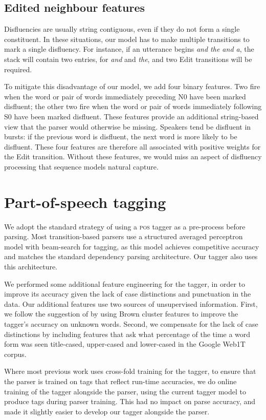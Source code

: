 \documentclass[11pt,letterpaper]{article}
\newcommand{\pos}{\textsc{pos}\xspace}
\begin{document}
\subsection{Edited neighbour features}

Disfluencies are usually
string contiguous, even if they do not form a single constituent.
In these situations, our model has to make multiple transitions to mark a single
disfluency. For instance, if an utterance begins \emph{and the and a}, the stack
will contain two entries, for \emph{and} and \emph{the}, and two Edit transitions
will be required.

To mitigate this disadvantage of our model, we add four binary features. Two fire
when the word or pair of words immediately preceding N0 have been marked disfluent;
the other two fire when the word or pair of words immediately following S0
have been marked disfluent. These features provide an additional string-based
view that the parser would otherwise be missing.  Speakers tend be disfluent
in bursts: if the previous word is disfluent, the next word is more likely
to be disfluent.  These four features are therefore all associated with
positive weights for the Edit transition.  Without these features, we would
miss an aspect of disfluency processing that sequence models natural capture.


\section{Part-of-speech tagging}

We adopt the standard strategy of using a \pos tagger as a pre-process
before parsing.  Most transition-based
parsers use a structured averaged perceptron model with beam-search for tagging,
as this model achieves competitive accuracy and matches the standard dependency
parsing architecture. Our tagger also uses this architecture.

We performed some additional feature engineering for the tagger, in order to
improve its accuracy given the lack of case distinctions and punctuation in
the data. Our additional features use two sources of unsupervised information.
First, we follow the suggestion of \citet{manning:11} by using Brown cluster
features to improve the tagger's accuracy on unknown words. Second, we compensate
for the lack of case distinctions by including features that ask what percentage
of the time a word form was seen title-cased, upper-cased and lower-cased in the
Google Web1T corpus. 

Where most previous work uses cross-fold training for the tagger, to ensure that the
parser is trained on tags that reflect run-time accuracies, we do online training
of the tagger alongside the parser, using the current tagger model to produce
tags during parser training.  This had no impact on parse accuracy, and made it
slightly easier to develop our tagger alongside the parser.
\end{document}
